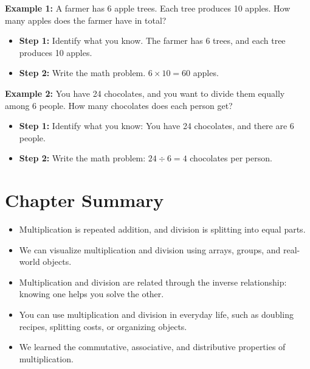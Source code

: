 \textbf{Example 1:} A farmer has 6 apple trees. Each tree produces 10 apples. How many apples does the farmer have in total?
\begin{itemize}
    \item \textbf{Step 1:} Identify what you know.
        The farmer has 6 trees, and each tree produces 10 apples.
    \item \textbf{Step 2:} Write the math problem.
        $6 \times 10 = 60$ apples.
\end{itemize}

\textbf{Example 2:} You have 24 chocolates, and you want to divide them equally among 6 people. How many chocolates does each person get?
\begin{itemize}
    \item \textbf{Step 1:} Identify what you know:
        You have 24 chocolates, and there are 6 people.
    \item \textbf{Step 2:} Write the math problem:
        $24 \div 6 = 4$ chocolates per person.
\end{itemize}

\section{Chapter Summary}
\begin{itemize}
    \item Multiplication is repeated addition, and division is splitting into equal parts.
    \item We can visualize multiplication and division using arrays, groups, and real-world objects.
    \item Multiplication and division are related through the inverse relationship: knowing one helps you solve the other.
    \item You can use multiplication and division in everyday life, such as doubling recipes, splitting costs, or organizing objects.
    \item We learned the commutative, associative, and distributive properties of multiplication.
\end{itemize}

